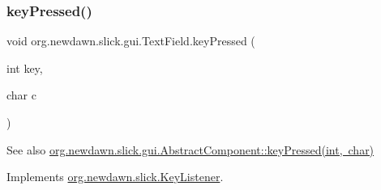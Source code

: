 \subsubsection{\texorpdfstring{key\+Pressed()}{keyPressed()}}
{\footnotesize\ttfamily void org.\+newdawn.\+slick.\+gui.\+Text\+Field.\+key\+Pressed (\begin{DoxyParamCaption}\item[{int}]{key,  }\item[{char}]{c }\end{DoxyParamCaption})\hspace{0.3cm}{\ttfamily [inline]}}

\begin{DoxySeeAlso}{See also}
\mbox{\hyperlink{classorg_1_1newdawn_1_1slick_1_1util_1_1_input_adapter_a3178218deea8aa330edf5e5c3699addc}{org.\+newdawn.\+slick.\+gui.\+Abstract\+Component\+::key\+Pressed(int, char)}} 
\end{DoxySeeAlso}


Implements \mbox{\hyperlink{interfaceorg_1_1newdawn_1_1slick_1_1_key_listener_ac0b0568a21ef486c4f51382614c196ef}{org.\+newdawn.\+slick.\+Key\+Listener}}.


